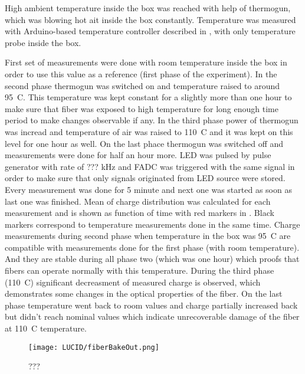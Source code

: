 High ambient temperature inside the box was reached with help of thermogun, which was blowing hot ait inside the box constantly.
Temperature was measured with Arduino-based temperature controller described in , with only temperature probe inside the box.

First set of measurements were done with room temperature inside the box in order to use this value as a reference (first phase of the experiment).
In the second phase thermogun was switched on and temperature raised to around 95\degree~C.
This temperature was kept constant for a slightly more than one hour to make sure that fiber was exposed to high temperature for
long enough time period to make changes observable if any. 
In the third phase power of thermogun was incread and temperature of air was raised to 110\degree~C and it was kept on this level for one hour as well.
On the last phace thermogun was switched off and measurements were done for half an hour more.
LED was pulsed by pulse generator with rate of ??? kHz and FADC was triggered with the same signal in order to make sure that only signals originated from LED 
source were stored.
Every measurement was done for 5 minute and next one was started as soon as last one was finished.
Mean of charge distribution was calculated for each measurement and is shown as function of time with red markers in .
Black markers correspond to temperature measurements done in the same time.
Charge measurements during second phase when temperature in the box was 95\degree~C are compatible with measurements done for the first phase 
(with room temperature).
And they are stable during all phase two (which was one hour) which proofs that fibers can operate normally with this temperature.
During the third phase (110\degree~C) significant decreasment of measured charge is observed, which demonstrates some changes in the
optical properties of the fiber. On the last phase temperature went back to room values and charge partially increased back but didn't reach 
nominal values which indicate unrecoverable damage of the fiber at 110\degree~C temperature.

\begin{figure}
\centering
\texttt{[image: LUCID/fiberBakeOut.png]}
\caption{???}
\label{fig:fiberBakeOut}
\end{figure}

